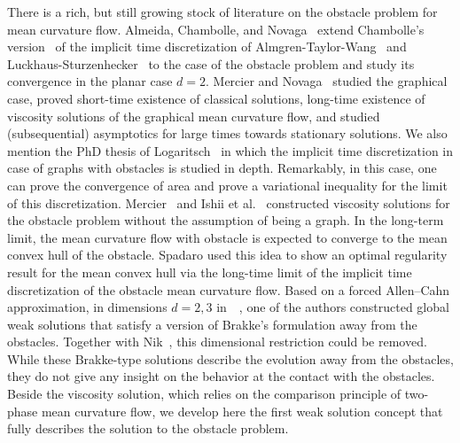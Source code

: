 \documentclass{amsart}
\theoremstyle{definition}
\begin{document}
There is a rich, but still growing stock of literature on the obstacle problem for mean curvature flow.
Almeida, Chambolle, and Novaga~\cite{MR2971026} extend Chambolle's version~\cite{MR2079603} of the implicit time discretization of Almgren-Taylor-Wang~\cite{MR1205983} and Luckhaus-Sturzenhecker~\cite{MR1386964} to the case of the obstacle problem and study its convergence in the planar case $d=2$. 
Mercier and Novaga~\cite{MR3421913} studied the graphical case, proved short-time existence of classical solutions, long-time existence of viscosity solutions of the graphical mean curvature flow, and studied (subsequential) asymptotics for large times towards stationary solutions.
We also mention the PhD thesis of Logaritsch~\cite{Logaritsch} in which the implicit time discretization in case of graphs with obstacles is studied in depth. Remarkably, in this case, one can prove the convergence of area and prove a variational inequality for the limit of this discretization.
Mercier~\cite{Mercier} and Ishii et al.~\cite{MR3746189} constructed viscosity solutions for the obstacle problem without the assumption of being a graph.
In the long-term limit, the mean curvature flow with obstacle is expected to converge to the mean convex hull of the obstacle.
Spadaro \cite{MR4069612} used this idea to show an optimal regularity result for the mean convex hull via the long-time limit of the implicit time discretization of the obstacle mean curvature flow.
Based on a forced Allen--Cahn approximation, in dimensions $d=2,3$ in~~\cite{MR4335627}, one of the authors constructed global weak solutions that satisfy a version of Brakke's formulation away from the obstacles. 
Together with Nik~\cite{MR4848696}, this dimensional restriction could be removed.
While these Brakke-type solutions describe the evolution away from the obstacles, they do not give any insight on the behavior at the contact with the obstacles.
Beside the viscosity solution, which relies on the comparison principle of two-phase mean curvature flow, we develop here the first weak solution concept that fully describes the solution to the obstacle problem.
\end{document}
